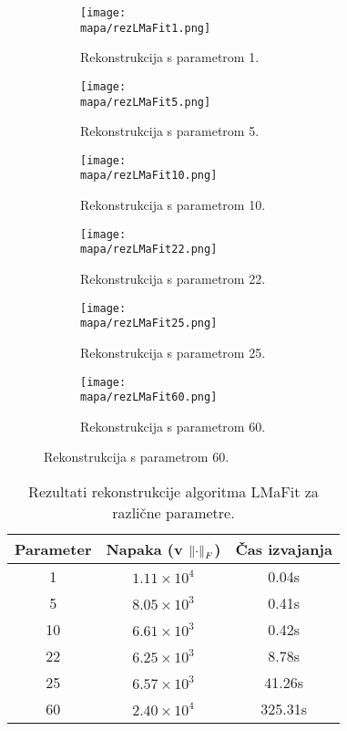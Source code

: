 \renewcommand{\mapa}{Poglavja/Slike/informacija ranga}

\begin{figure}[!ht]
    \begin{subfigure}{0.325\linewidth}
        \texttt{[image: \\mapa/rezLMaFit1.png]}
        \caption{Rekonstrukcija s parametrom 1.}
    \end{subfigure}
    \hfill
    \begin{subfigure}{0.325\linewidth}
        \texttt{[image: \\mapa/rezLMaFit5.png]}
        \caption{Rekonstrukcija s parametrom 5.}
    \end{subfigure}
    \hfill
    \begin{subfigure}{0.325\linewidth}
        \texttt{[image: \\mapa/rezLMaFit10.png]}
        \caption{Rekonstrukcija s parametrom 10.}
    \end{subfigure}

    \begin{subfigure}{0.325\linewidth}
        \texttt{[image: \\mapa/rezLMaFit22.png]}
        \caption{Rekonstrukcija s parametrom 22.}
    \end{subfigure}
    \hfill
    \begin{subfigure}{0.325\linewidth}
        \texttt{[image: \\mapa/rezLMaFit25.png]}
        \caption{Rekonstrukcija s parametrom 25.}
    \end{subfigure}
    \hfill
    \begin{subfigure}{0.325\linewidth}
        \texttt{[image: \\mapa/rezLMaFit60.png]}
        \caption{Rekonstrukcija s parametrom 60.}
    \end{subfigure}
\end{figure}

\begin{table}[h]
    \centering
    \begin{tabular}{|c|c|c|}
        \hline
        Parameter & Napaka (v $\left\lVert\cdot\right\rVert_F$)& Čas izvajanja \\
        \hline
        1         & $1.11 \times 10^4$ & 0.04s        \\
        5         & $8.05 \times 10^3$ & 0.41s         \\
        10        & $6.61 \times 10^3$ & 0.42s        \\
        22        & $6.25 \times 10^3$ & 8.78s       \\
        25        & $6.57 \times 10^3$ & 41.26s        \\
        60        & $2.40 \times 10^4$ & 325.31s        \\
        \hline
    \end{tabular}
    \caption{Rezultati rekonstrukcije algoritma LMaFit za različne parametre.}
\end{table}
